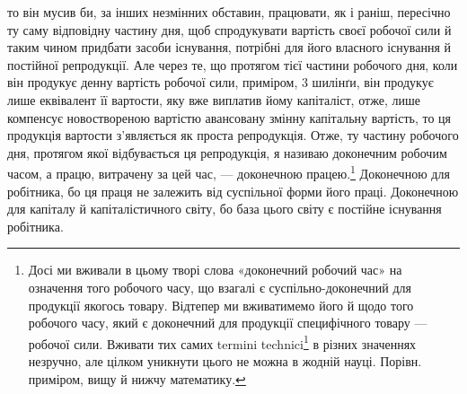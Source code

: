 \parcont{}  %
то він мусив би, за інших незмінних обставин, працювати, як і раніш, пересічно ту саму відповідну
частину дня, щоб спродукувати вартість своєї робочої сили й таким чином придбати засоби існування,
потрібні для його власного існування й постійної репродукції. Але через те, що протягом тієї частини
робочого дня,
коли він продукує денну вартість робочої сили, приміром, 3 шилінґи, він продукує лише еквівалент її
вартости, яку вже виплатив йому капіталіст, отже, лише компенсує новоствореною вартістю
авансовану змінну капітальну вартість, то ця продукція вартости з’являється як проста репродукція.
Отже, ту частину
робочого дня, протягом якої відбувається ця репродукція, я називаю доконечним робочим часом, а
працю, витрачену
за цей час, — доконечною працею.\footnote{
Досі ми вживали в цьому творі слова «доконечний робочий час» на означення того робочого часу, що
взагалі є суспільно-доконечний для продукції якогось товару. Відтепер ми вживатимемо його й щодо
того
робочого часу, який є доконечний для продукції специфічного товару — робочої сили. Вживати тих самих
termini technici\footnote*{
— технічних термінів. \emph{Ред.}
} в різних значеннях незручно, але цілком уникнути цього не можна в жодній науці.
Порівн. приміром, вищу й нижчу математику.
} Доконечною для робітника, бо ця праця не залежить від суспільної
форми його праці.
Доконечною для капіталу й капіталістичного світу, бо база цього
світу є постійне існування робітника.

